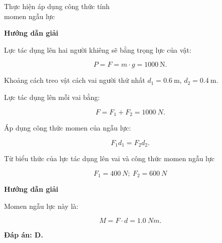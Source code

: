 \begin{dang}{Thực hiện áp dụng công thức tính\\ momen ngẫu lực}
	{	\begin{center}
			\textbf{Hướng dẫn giải}
		\end{center}
		
		Lực tác dụng lên hai người khiêng sẽ bằng trọng lực của vật: 
		
		$$P=F=m \cdot g=\SI{1000}{\newton}. $$
		
		Khoảng cách treo vật cách vai người thứ nhất $d_1=\SI{0,6}{\meter}$, $d_2=\SI{0,4}{\meter}$.
		
		Lực tác dụng lên mỗi vai bằng:
		
		$$F=F_1+F_2=\SI{1000}{N}.$$ 
		
		Áp dụng công thức momen của ngẫu lực:
		
		$$F_1d_1=F_2d_2. $$
		
		Từ biểu thức của lực tác dụng lên vai và công thức momen ngẫu lực 
		
		$$F_1=\SI{400}{N};\ F_2=\SI{600}{N}$$
	}
	{	\begin{center}
			\textbf{Hướng dẫn giải}
		\end{center}
		
		Momen ngẫu lực này là:
		
		$$M=F \cdot d= \SI{1,0}{Nm}.$$
		
		\textbf{Đáp án: D.}
	}
\end{dang}